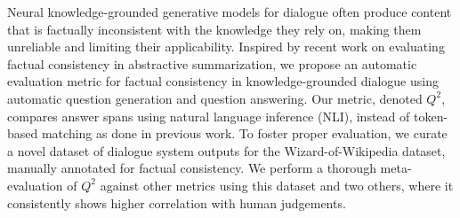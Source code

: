 Neural knowledge-grounded generative models for dialogue often produce content that is factually inconsistent with the knowledge they rely on, making them unreliable and limiting their applicability. Inspired by recent work on evaluating factual consistency in abstractive summarization, we propose an automatic evaluation metric for factual consistency in knowledge-grounded dialogue using automatic question generation and question answering. Our metric, denoted $Q^2$, compares answer spans using natural language inference (NLI), instead of token-based matching as done in previous work. To foster proper evaluation, we curate a novel dataset of dialogue system outputs for the Wizard-of-Wikipedia dataset, manually annotated for factual consistency. We perform a thorough meta-evaluation of $Q^2$ against other metrics using this dataset and two others, where it consistently shows higher correlation with human judgements.
